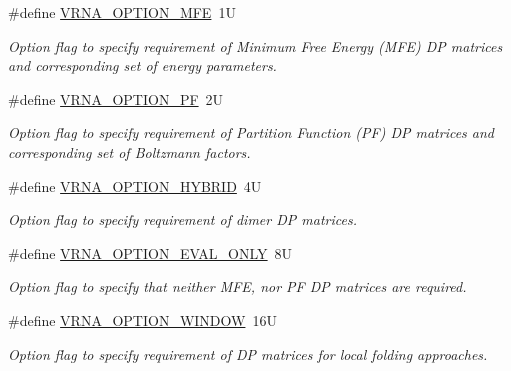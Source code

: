 \begin{DoxyCompactItemize}
\#define \mbox{\hyperlink{group__fold__compound_gae63be9127fe7dcc1f9bb14f5bb1064ee}{V\+R\+N\+A\+\_\+\+O\+P\+T\+I\+O\+N\+\_\+\+M\+FE}}~1U
\begin{DoxyCompactList}\small\item\em Option flag to specify requirement of Minimum Free Energy (M\+FE) DP matrices and corresponding set of energy parameters. \end{DoxyCompactList}\item 
\#define \mbox{\hyperlink{group__fold__compound_gabfbadcddda3e74ce7f49035ef8f058f7}{V\+R\+N\+A\+\_\+\+O\+P\+T\+I\+O\+N\+\_\+\+PF}}~2U
\begin{DoxyCompactList}\small\item\em Option flag to specify requirement of Partition Function (PF) DP matrices and corresponding set of Boltzmann factors. \end{DoxyCompactList}\item 
\mbox{\label{group__fold__compound_ga8f681fa12b8d4b348bf58415fd1fc82f}} 
\#define \mbox{\hyperlink{group__fold__compound_ga8f681fa12b8d4b348bf58415fd1fc82f}{V\+R\+N\+A\+\_\+\+O\+P\+T\+I\+O\+N\+\_\+\+H\+Y\+B\+R\+ID}}~4U
\begin{DoxyCompactList}\small\item\em Option flag to specify requirement of dimer DP matrices. \end{DoxyCompactList}\item 
\#define \mbox{\hyperlink{group__fold__compound_ga61469c423131552c8483229f8b6c7e0e}{V\+R\+N\+A\+\_\+\+O\+P\+T\+I\+O\+N\+\_\+\+E\+V\+A\+L\+\_\+\+O\+N\+LY}}~8U
\begin{DoxyCompactList}\small\item\em Option flag to specify that neither M\+FE, nor PF DP matrices are required. \end{DoxyCompactList}\item 
\mbox{\label{group__fold__compound_ga2b2a8009ccdccc3eb1571556261aee8e}} 
\#define \mbox{\hyperlink{group__fold__compound_ga2b2a8009ccdccc3eb1571556261aee8e}{V\+R\+N\+A\+\_\+\+O\+P\+T\+I\+O\+N\+\_\+\+W\+I\+N\+D\+OW}}~16U
\begin{DoxyCompactList}\small\item\em Option flag to specify requirement of DP matrices for local folding approaches. \end{DoxyCompactList}\end{DoxyCompactItemize}
